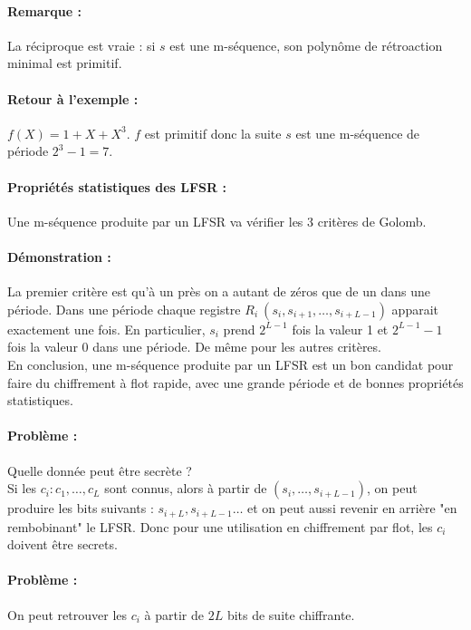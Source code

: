 \documentclass[12pt,a4paper]{report}
\begin{document}
\paragraph{Remarque :\\}
La réciproque est vraie : si $s$ est une m-séquence, son polynôme de rétroaction minimal est primitif.

\paragraph{Retour à l'exemple :\\}
$f(X) = 1+X+X^3$. $f$ est primitif donc la suite $s$ est une m-séquence de période $2^3-1=7$.
\paragraph{Propriétés statistiques des LFSR :\\}
Une m-séquence produite par un LFSR va vérifier les 3 critères de Golomb.
\paragraph{Démonstration :\\}
La premier critère est qu'à un près on a autant de zéros que de un dans une période. Dans une période chaque registre $R_i\ (s_i,s_{i+1}, \ldots, s_{i+L-1})$ apparait exactement une fois. En particulier, $s_i$ prend $2^{L-1}$ fois la valeur 1 et $2^{L-1}-1$ fois la valeur 0 dans une période. De même pour les autres critères.\\

En conclusion, une m-séquence produite par un LFSR est un bon candidat pour faire du chiffrement à flot rapide, avec une grande période et de bonnes propriétés statistiques.

\paragraph{Problème :} Quelle donnée peut être secrète ? \\
Si les $c_i : c_1, \ldots, c_L$ sont connus, alors à partir de $(s_i, \ldots, s_{i+L-1})$, on peut produire les bits suivants : $s_{i+L}, s_{i+L-1} \ldots$ et on peut aussi revenir en arrière "en rembobinant" le LFSR. Donc pour une utilisation en chiffrement par flot, les $c_i$ doivent être secrets.
\paragraph{Problème :\\}
On peut retrouver les $c_i$ à partir de $2L$ bits de suite chiffrante.
\end{document}
